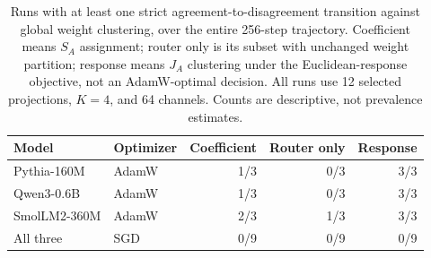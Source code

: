 \begin{table}[t]
\centering\small
\begin{tabular}{llrrr}
\toprule
Model & Optimizer & Coefficient & Router only & Response \\
\midrule
Pythia-160M & AdamW & 1/3 & 0/3 & 3/3 \\
Qwen3-0.6B & AdamW & 1/3 & 0/3 & 3/3 \\
SmolLM2-360M & AdamW & 2/3 & 1/3 & 3/3 \\
All three & SGD & 0/9 & 0/9 & 0/9 \\
\bottomrule\end{tabular}
\caption{Runs with at least one strict agreement-to-disagreement transition against global weight clustering, over the entire 256-step trajectory. Coefficient means $S_A$ assignment; router only is its subset with unchanged weight partition; response means $J_A$ clustering under the Euclidean-response objective, not an AdamW-optimal decision. All runs use 12 selected projections, $K=4$, and 64 channels. Counts are descriptive, not prevalence estimates.}
\label{tab:training-crossings}
\end{table}
